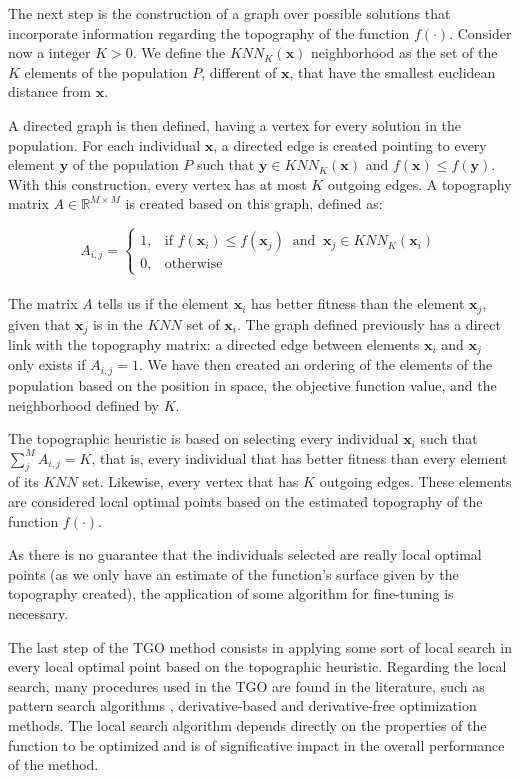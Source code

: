 The next step is the construction of a graph over possible solutions that incorporate information regarding the topography of the function $f(\cdot)$. Consider now a integer $K > 0$. We define the $KNN_K(\bm{x})$ neighborhood as the set of the $K$ elements of the population $P$, different of $\bm{x}$, that have the smallest euclidean distance from $\bm{x}$.

A directed graph is then defined, having a vertex for every solution in the population. For each individual $\bm{x}$, a directed edge is created pointing to every element $\bm{y}$ of the population $P$ such that $\bm{y} \in KNN_K(\bm{x})$ and $f(\bm{x}) \leq f(\bm{y})$. With this construction, every vertex has at most $K$ outgoing edges. A topography matrix $A \in \mathbb{R}^{M \times M}$ is created based on this graph, defined as:


\[
    A_{i, j} = 
\begin{cases}
    1,& \text{if } f(\bm{x}_i) \leq f(\bm{x}_j) \ \text{ and } \ \bm{x}_j \in KNN_K(\bm{x}_i) \\
    0,& \text{otherwise}
\end{cases}
\]
\\[-1.5em]


The matrix $A$ tells us if the element $\bm{x}_i$ has better fitness than the element $\bm{x}_j$, given that $\bm{x}_j$ is in the $KNN$ set of $\bm{x}_i$. The graph defined previously has a direct link with the topography matrix: a directed edge between elements $\bm{x}_i$ and $\bm{x}_j$ only exists if $A_{i, j} = 1$. We have then created an ordering of the elements of the population based on the position in space, the objective function value, and the neighborhood defined by $K$.

The topographic heuristic is based on selecting every individual $\bm{x}_i$ such that \allowbreak $\sum_j^M A_{i, j} = K$, that is, every individual that has better fitness than every element of its $KNN$ set. Likewise, every vertex that has $K$ outgoing edges. These elements are considered local optimal points based on the estimated topography of the function $f(\cdot)$.

As there is no guarantee that the individuals selected are really local optimal points (as we only have an estimate of the function's surface given by the topography created), the application of some algorithm for fine-tuning is necessary.

The last step of the TGO method consists in applying some sort of local search in every local optimal point based on the topographic heuristic. Regarding the local search, many procedures used in the TGO are found in the literature, such as pattern search algorithms \citep{ITGO2}, derivative-based \citep{ITGO3} and derivative-free \citep{ITGO4} optimization methods. The local search algorithm depends directly on the properties of the function to be optimized and is of significative impact in the overall performance of the method.

